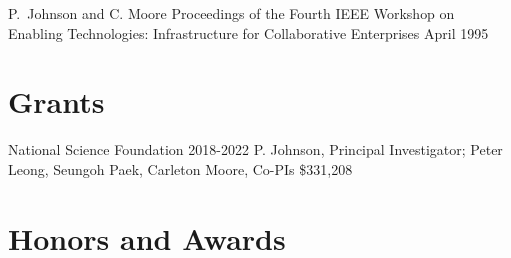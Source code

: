 \documentclass[11pt,letterpaper,sans]{moderncv} %
\begin{document}
          {P.~Johnson and C. Moore}
          {Proceedings of the Fourth IEEE Workshop on Enabling Technologies: Infrastructure for Collaborative Enterprises}
          {April 1995}


\section{Grants}

        {National Science Foundation} %
        {2018-2022} %
        {P. Johnson, Principal Investigator; Peter Leong, Seungoh Paek, Carleton Moore, Co-PIs}  %
        {\$331,208} %

\section{Honors and Awards}

\end{document}

